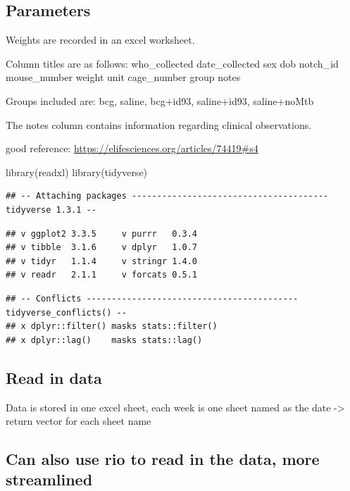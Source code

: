 \documentclass[
]{book}
\newenvironment{Shaded}{\begin{snugshade}}{\end{snugshade}}
\newcommand{\FunctionTok}[1]{\textcolor[rgb]{0.00,0.00,0.00}{#1}}
\newcommand{\NormalTok}[1]{#1}
\begin{document}
\hypertarget{parameters}{%
\subsection{Parameters}\label{parameters}}

Weights are recorded in an excel worksheet.

Column titles are as follows: who\_collected date\_collected sex dob notch\_id mouse\_number weight unit cage\_number group notes

Groups included are: bcg, saline, bcg+id93, saline+id93, saline+noMtb

The notes column contains information regarding clinical observations.

good reference: \url{https://elifesciences.org/articles/74419\#s4}

\begin{Shaded}
\begin{Highlighting}[]
\FunctionTok{library}\NormalTok{(readxl)}
\FunctionTok{library}\NormalTok{(tidyverse)}
\end{Highlighting}
\end{Shaded}

\begin{verbatim}
## -- Attaching packages --------------------------------------- tidyverse 1.3.1 --
\end{verbatim}

\begin{verbatim}
## v ggplot2 3.3.5     v purrr   0.3.4
## v tibble  3.1.6     v dplyr   1.0.7
## v tidyr   1.1.4     v stringr 1.4.0
## v readr   2.1.1     v forcats 0.5.1
\end{verbatim}

\begin{verbatim}
## -- Conflicts ------------------------------------------ tidyverse_conflicts() --
## x dplyr::filter() masks stats::filter()
## x dplyr::lag()    masks stats::lag()
\end{verbatim}

\hypertarget{read-in-data}{%
\subsection{Read in data}\label{read-in-data}}

Data is stored in one excel sheet, each week is one sheet named as the date -\textgreater{} return vector for each sheet name

\hypertarget{can-also-use-rio-to-read-in-the-data-more-streamlined}{%
\subsection{Can also use rio to read in the data, more streamlined}\label{can-also-use-rio-to-read-in-the-data-more-streamlined}}
\end{document}
